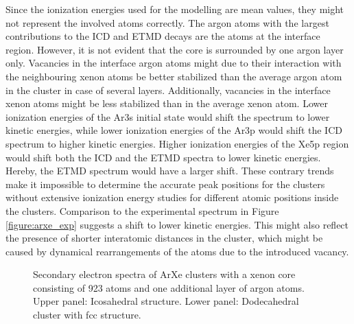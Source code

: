 Since the ionization energies used for the modelling are mean values, they
might not represent the involved atoms correctly. The argon atoms with the
largest contributions to the ICD and ETMD decays are the atoms at the interface
region. However, it is not evident that the core is surrounded by one argon
layer only. Vacancies in the interface argon atoms might due to
their interaction with the
neighbouring xenon atoms be better stabilized than the average argon atom in the
cluster in case of several layers. Additionally, vacancies in the interface
xenon atoms might be less stabilized than in the average xenon atom.
Lower ionization energies of the Ar3s initial state would shift the spectrum
to lower kinetic energies, while lower ionization energies of the Ar3p
would shift the \ac{ICD} spectrum to higher kinetic energies.
Higher ionization energies of the Xe5p region would shift both the ICD and
the ETMD spectra to lower kinetic energies. Hereby, the ETMD spectrum would
have a larger shift. These contrary trends make it impossible to determine the
accurate peak positions for the clusters without extensive ionization energy
studies for different atomic positions inside the clusters.
Comparison to the experimental spectrum in Figure \ref{figure:arxe_exp}
suggests a shift to lower kinetic energies.
This might also reflect the presence of shorter interatomic distances
in the cluster,
which might be caused by dynamical rearrangements of the atoms due to
the introduced vacancy.


\begin{figure}[]
 \centering
 
 
 \caption{Secondary electron spectra of ArXe clusters with a xenon core
          consisting of 923 atoms and one additional layer of argon atoms.\\
          Upper panel: Icosahedral structure. Lower panel: Dodecahedral
          cluster with fcc structure.}
 \label{figure:exp_923_arxe}
\end{figure}


